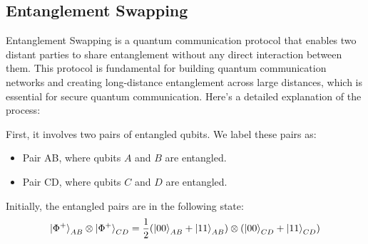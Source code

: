 \documentclass{article}
\begin{document}
	\subsection{Entanglement Swapping}

	Entanglement Swapping is a quantum communication protocol that enables two distant parties to share entanglement without any direct interaction between them. This protocol is fundamental for building quantum communication networks and creating long-distance entanglement across large distances, which is essential for secure quantum communication. Here’s a detailed explanation of the process:

	First, it involves two pairs of entangled qubits. We label these pairs as:
	\begin{itemize}
		\item Pair AB, where qubits \( A \) and \( B \) are entangled.
		\item Pair CD, where qubits \( C \) and \( D \) are entangled.
	\end{itemize}

	Initially, the entangled pairs are in the following state:
	\[
	\ket{\Phi^+}_{AB} \otimes \ket{\Phi^+}_{CD} = \frac{1}{2} (\ket{00}_{AB} + \ket{11}_{AB}) \otimes (\ket{00}_{CD} + \ket{11}_{CD})
	\]
\end{document}
